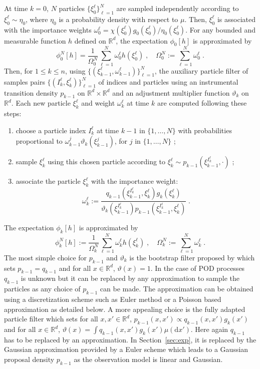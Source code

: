 \documentclass[12pt]{article}
\newcommand{\rmd}{\mathrm{d}}
\newcommand{\eqsp}{\;}
\newcommand{\1}{\mathrm{1}}
\begin{document}
At time $k = 0$, $N$ particles $\{\xi^{\ell}_0\}_{\ell=1}^N$ are sampled independently according to  $\xi^{\ell}_0 \sim \eta_0$, where $\eta_0$ is a probability density with respect to $\mu$. 
Then, $\xi^{\ell}_0$ is associated with the importance weights $\omega_0^{\ell} = \chi(\xi^{\ell}_0)g_0 (\xi^{\ell}_0)/\eta_0(\xi^{\ell}_0)$. 
For any bounded and measurable function $h$ defined on $\mathbb{R}^d$, the expectation $\phi_{0}[h] $ is approximated by
\[
\phi^N_{0}[h] = \frac{1}{\Omega_0^N} \sum_{\ell=1}^N \omega_0^{\ell} h \left(\xi^{\ell}_0 \right)\eqsp, \quad \Omega_0^N:= \sum_{\ell=1}^N \omega_0^{\ell}\eqsp.
\]
Then, for $1\le k \le n$, using $\{(\xi^{\ell}_{k-1},\omega^{\ell}_{k-1})\}_{\ell=1}^N$, the auxiliary particle filter of \cite{pitt:shephard:1999} samples pairs $\{(I^{\ell}_k,\xi^{\ell}_{k})\}_{\ell=1}^N$ of indices and particles using an instrumental transition density $p_{k-1}$ on $\mathbb{R}^d\times \mathbb{R}^d$ and an adjustment multiplier function $\vartheta_k$ on $\mathbb{R}^d$.
 Each new particle $\xi^{\ell}_{k}$ and weight $\omega^{\ell}_k$ at time $k$ are computed following these steps:
\begin{enumerate}[-]
\item choose a particle index $I^{\ell}_k$ at time $k-1$ in $\{1,\ldots,N\}$ with probabilities proportional to $\omega_{k-1}^{j} \vartheta_k (\xi^{j}_{k-1})$, for $j$ in $\{1,\ldots,N\}$ ;
\item sample  $\xi^{\ell}_{k}$ using this chosen particle according to $\xi^{\ell}_{k} \sim p_{k-1}(\xi^{I^{\ell}_k}_{k-1},\cdot)$ ; 
\item  associate the particle $\xi^{\ell}_k$ with the importance weight:
\begin{equation}
\label{eq:importance:weights}
\omega^{\ell}_k := \frac{q_{k-1}(\xi_{k-1}^{I^{\ell}_k},\xi^{\ell}_k)g_k(\xi^{\ell}_k)}{\vartheta_k(\xi^{I^{\ell}_k}_{k-1}) p_{k-1} (\xi_{k-1}^{I^{\ell}_k},\xi^{\ell}_k)}\eqsp.
\end{equation}
\end{enumerate} 
The expectation $\phi_{k}[h]$ is approximated by
\[
\phi^N_{k}[h] := \frac{1}{\Omega_k^N} \sum_{\ell=1}^N \omega_k^{\ell} h \left(\xi^{\ell}_k \right)\eqsp,\quad\Omega_k^N:= \sum_{\ell=1}^N \omega_k^{\ell}\eqsp.
\]
The most simple choice for $p_{k-1}$ and $\vartheta_k$ is the bootstrap filter proposed by \cite{gordon:salmond:smith:1993} which sets $p_{k-1} = q_{k-1}$ and for all $x\in\mathbb{R}^d$, $\vartheta(x) = 1$.
 In the case of POD processes $q_{k-1}$ is unknown but it can be replaced by any approximation to sample the particles as any choice of $p_{k-1}$ can be made.
  The approximation can be obtained using a discretization scheme such as Euler method or a Poisson based approximation as detailed below.
   A more appealing choice is the fully adapted particle filter which sets for all $x,x'\in\mathbb{R}^d$, $p_{k-1}(x,x') \propto q_{k-1}(x,x')g_k(x')$ and for all $x\in\mathbb{R}^d$, $\vartheta(x) = \int q_{k-1}(x,x')g_k(x')\mu(\rmd x')$.
   Here again $q_{k-1}$ has to be replaced by an approximation. In Section~\ref{sec:exp}, it is replaced by the Gaussian approximation provided by a Euler scheme which leads to a Gaussian proposal density $p_{k-1}$ as the observation model is linear and Gaussian. 
\end{document}
